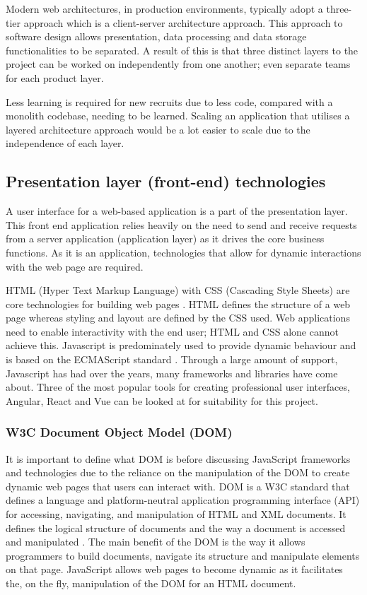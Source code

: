 Modern web architectures, in production environments, typically adopt a three-tier approach which is a client-server architecture approach.
This approach to software design allows presentation, data processing and data storage functionalities to be separated.
A result of this is that three distinct layers to the project can be worked on independently from one another; even separate teams for
each product layer. 

Less learning is required for new recruits due to less code, compared with a monolith codebase, needing to be learned.
Scaling an application that utilises a layered architecture approach would be a lot easier to scale due to the independence of each layer.

\subsection{Presentation layer (front-end) technologies}
A user interface for a web-based application is a part of the presentation layer.
This front end application relies heavily on the need to send and receive requests from a server application (application layer) as 
it drives the core business functions.
As it is an application, technologies that allow for dynamic interactions with the web page are required.

HTML (Hyper Text Markup Language) with CSS (Cascading Style Sheets) are core technologies for building web pages \cite{w3c_html_css}.
HTML defines the structure of a web page whereas styling and layout are defined by the CSS used.
Web applications need to enable interactivity with the end user; HTML and CSS alone cannot achieve this.
Javascript is predominately used to provide dynamic behaviour and is based on the ECMAScript standard \cite{stefanov2010javascript}.
Through a large amount of support, Javascript has had over the years, many frameworks and libraries have come about.
Three of the most popular tools for creating professional user interfaces, Angular, React and Vue \cite{stateofjs_2018} can be looked at for suitability for this project.

\subsubsection{W3C Document Object Model (DOM)}
It is important to define what DOM is before discussing JavaScript frameworks and technologies due to the reliance on the manipulation of the DOM to create dynamic web pages that users can interact with.
DOM is a W3C standard that defines a language and platform-neutral application programming interface (API) for accessing, navigating, and 
manipulation of HTML and XML documents.
It defines the logical structure of documents and the way a document is accessed and manipulated \cite{wood1999programming}.
The main benefit of the DOM is the way it allows programmers to build documents, navigate its structure and manipulate elements on that page.
JavaScript allows web pages to become dynamic as it facilitates the, on the fly, manipulation of the DOM for an HTML document.

